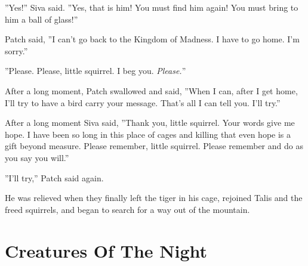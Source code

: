 \documentclass[12pt]{book}
\begin{document}
''Yes!'' Siva said. ''Yes, that is him! You must find him again! You must bring to him a ball of glass!''\par
Patch said, ''I can't go back to the Kingdom of Madness. I have to go home. I'm sorry.''\par
''Please. Please, little squirrel. I beg you. {\it Please.}''\par
After a long moment, Patch swallowed and said, ''When I can, after I get home, I'll try to have a bird carry your message. That's all I can tell you. I'll try.''\par
After a long moment Siva said, ''Thank you, little squirrel. Your words give me hope. I have been so long in this place of cages and killing that even hope is a gift beyond measure. Please remember, little squirrel. Please remember and do as you say you will.''\par
''I'll try,'' Patch said again.\par
He was relieved when they finally left the tiger in his cage, rejoined Talis and the freed squirrels, and began to search for a way out of the mountain.\par

\section{Creatures Of The Night}
\end{document}
